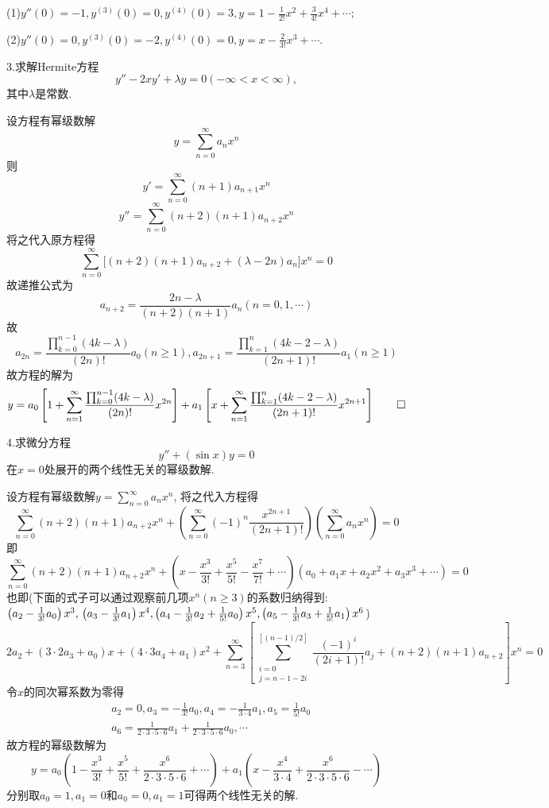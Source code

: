 \begin{solve}
(1)$y''(0)=-1,y^{(3)}(0)=0,y^{(4)}(0)=3,y=1-\frac{1}{2!}x^2+\frac{3}{4!}x^4+\cdots$;

(2)$y''(0)=0,y^{(3)}(0)=-2,y^{(4)}(0)=0,y=x-\frac{2}{3!}x^3+\cdots$.
\end{solve}


3.求解Hermite方程
\[y''-2xy'+\lambda y=0(-\infty<x<\infty),\]
其中$\lambda$是常数.

\begin{solve} 设方程有幂级数解\[y=\sum_{n=0}^{\infty}a_nx^n\] 则
\[y'=\sum_{n=0}^{\infty}(n+1)a_{n+1}x^n\]
\[y''=\sum_{n=0}^{\infty}(n+2)(n+1)a_{n+2}x^n\]
将之代入原方程得
\[\sum_{n=0}^{\infty}\big[(n+2)(n+1)a_{n+2}+(\lambda-2n)a_n\big]x^n=0\]
故递推公式为
\[a_{n+2}=\frac{2n-\lambda}{(n+2)(n+1)}a_n(n=0,1,\cdots)\]
故\[a_{2n}=\frac{\prod_{k=0}^{n-1}(4k-\lambda)}{(2n)!}a_0(n\geq1),a_{2n+1}=\frac{\prod_{k=1}^n(4k-2-\lambda)}{(2n+1)!}a_1(n\geq1)\]
故方程的解为
\[y=a_0\left[1+\sum_{n=1}^{\infty}\frac{\prod_{k=0}^{n-1}(4k-\lambda)}{(2n)!}x^{2n}\right]+a_1\left[x+\sum_{n=1}^{\infty}\frac{\prod_{k=1}^n(4k-2-\lambda)}{(2n+1)!}x^{2n+1}\right]\qedhere\]
\end{solve}


4.求微分方程
\[y''+(\sin x)y=0\]
在$x=0$处展开的两个线性无关的幂级数解.

\begin{solve}
设方程有幂级数解$y=\sum_{n=0}^{\infty}a_nx^n$, 将之代入方程得
\[\sum_{n=0}^{\infty}(n+2)(n+1)a_{n+2}x^n+\left(\sum_{n=0}^{\infty}(-1)^n\frac{x^{2n+1}}{(2n+1)!}\right)\left(\sum_{n=0}^{\infty}a_nx^n\right)=0\]
即
\[\sum_{n=0}^{\infty}(n+2)(n+1)a_{n+2}x^n+\left(x-\frac{x^3}{3!}+\frac{x^5}{5!}-\frac{x^7}{7!}+\cdots\right)\left(a_0+a_1x+a_2x^2+a_3x^3+\cdots\right)=0\]
也即(下面的式子可以通过观察前几项$x^n(n\geq3)$的系数归纳得到: $\left(a_2-\frac{1}{3!}a_0\right)x^3,\\\left(a_3-\frac{1}{3!}a_1\right)x^4,\left(a_4-\frac{1}{3!}a_2+\frac{1}{5!}a_0\right)x^5,\left(a_5-\frac{1}{3!}a_3+\frac{1}{5!}a_1\right)x^6$)
\[2a_2+(3\cdot2a_3+a_0)x+(4\cdot3a_4+a_1)x^2+\sum_{n=3}^{\infty}\left[\sum_{\substack{i=0\\j=n-1-2i}}^{[(n-1)/2]}\frac{(-1)^i}{(2i+1)!}a_j+(n+2)(n+1)a_{n+2}\right]x^n=0\]
令$x$的同次幂系数为零得
\[\begin{split}&a_2=0,a_3=-\frac{1}{3!}a_0,a_4=-\frac{1}{3\cdot4}a_1,a_5=\frac{1}{5!}a_0\\
&a_6=\frac{1}{2\cdot3\cdot5\cdot6}a_1+\frac{1}{2\cdot3\cdot5\cdot6}a_0,\cdots\end{split}\]
故方程的幂级数解为
\[y=a_0\left(1-\frac{x^3}{3!}+\frac{x^5}{5!}+\frac{x^6}{2\cdot3\cdot5\cdot6}+\cdots\right)+a_1\left(x-\frac{x^4}{3\cdot4}+\frac{x^6}{2\cdot3\cdot5\cdot6}-\cdots\right)\]
分别取$a_0=1,a_1=0$和$a_0=0,a_1=1$可得两个线性无关的解.
\end{solve}



